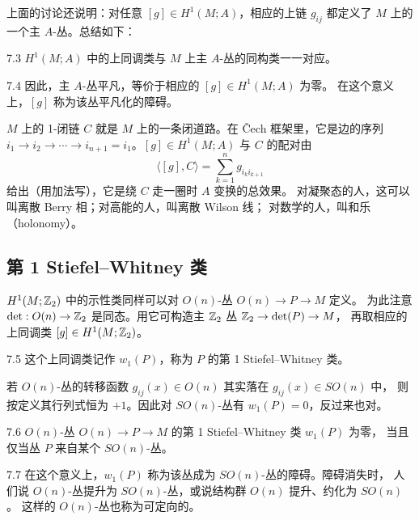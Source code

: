 上面的讨论还说明：对任意 $[g]\in H^1(M;A)$，相应的上链 $g_{ij}$ 都定义了 $M$ 上的一个主 $A$-丛。总结如下：

\begin{proposition}{7.3}
$H^1(M;A)$ 中的上同调类与 $M$ 上主 $A$-丛的同构类一一对应。
\end{proposition}

\begin{remark}{7.4}
因此，主 $A$-丛平凡，等价于相应的 $[g]\in H^1(M;A)$ 为零。
在这个意义上，$[g]$ 称为该丛平凡化的障碍。
\end{remark}

$M$ 上的 1-闭链 $C$ 就是 $M$ 上的一条闭道路。在 Čech 框架里，它是边的序列
$i_1\to i_2\to\cdots\to i_{n+1}=i_1$。$[g]\in H^1(M;A)$ 与 $C$ 的配对由
\begin{equation}
\langle[g],C\rangle=\sum_{k=1}^{n}g_{i_ki_{k+1}}
\tag{7.12}
\end{equation}
给出（用加法写），它是绕 $C$ 走一圈时 $A$ 变换的总效果。
对凝聚态的人，这可以叫离散 Berry 相；对高能的人，叫离散 Wilson 线；
对数学的人，叫和乐（holonomy）。

\subsection{第 1 Stiefel--Whitney 类}

$H^1(M;\mathbb{Z}_2)$ 中的示性类同样可以对 $O(n)$-丛 $O(n)\to P\to M$ 定义。
为此注意 $\det:O(n)\to\mathbb{Z}_2$ 是同态。用它可构造主 $\mathbb{Z}_2$ 丛 $\mathbb{Z}_2\to\det(P)\to M$，
再取相应的上同调类 $[g]\in H^1(M;\mathbb{Z}_2)$。

\begin{definition}{7.5}
这个上同调类记作 $w_1(P)$，称为 $P$ 的第 1 Stiefel--Whitney 类。
\end{definition}

若 $O(n)$-丛的转移函数 $g_{ij}(x)\in O(n)$ 其实落在 $g_{ij}(x)\in SO(n)$ 中，
则按定义其行列式恒为 $+1$。因此对 $SO(n)$-丛有 $w_1(P)=0$，反过来也对。

\begin{proposition}{7.6}
$O(n)$-丛 $O(n)\to P\to M$ 的第 1 Stiefel--Whitney 类 $w_1(P)$ 为零，
当且仅当丛 $P$ 来自某个 $SO(n)$-丛。
\end{proposition}

\begin{remark}{7.7}
在这个意义上，$w_1(P)$ 称为该丛成为 $SO(n)$-丛的障碍。障碍消失时，
人们说 $O(n)$-丛提升为 $SO(n)$-丛，或说结构群 $O(n)$ 提升、约化为 $SO(n)$。
这样的 $O(n)$-丛也称为可定向的。
\end{remark}

